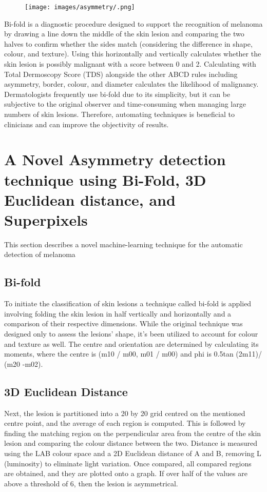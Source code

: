 \begin{figure}
    \centering
    \texttt{[image: images/asymmetry/.png]}
    \caption{} 
\end{figure}\label{asy-examples}



Bi-fold is a diagnostic procedure designed to support the recognition of melanoma by drawing a line down the middle of the skin lesion and comparing the two halves to confirm whether the sides match (considering the difference in shape, colour, and texture). Using this horizontally and vertically calculates whether the skin lesion is possibly malignant with a score between 0 and 2. Calculating with Total Dermoscopy Score (TDS) alongside the other ABCD rules including asymmetry, border, colour, and diameter calculates the likelihood of malignancy. Dermatologists frequently use bi-fold due to its simplicity, but it can be subjective to the original observer and time-consuming when managing large numbers of skin lesions. Therefore, automating techniques is beneficial to clinicians and can improve the objectivity of results.

\section{A Novel Asymmetry detection technique using Bi-Fold, 3D Euclidean distance, and Superpixels}
This section describes a novel machine-learning technique for the automatic detection of melanoma

\subsection{Bi-fold}
To initiate the classification of skin lesions a technique called bi-fold is applied involving folding the skin lesion in half vertically and horizontally and a comparison of their respective dimensions. While the original technique was designed only to assess the lesions' shape, it's been utilized to account for colour and texture as well. The centre and orientation are determined by calculating its moments, where the centre is (m10 / m00, m01 / m00) and phi is 0.5tan (2m11)/ (m20 -m02).


\subsection{3D Euclidean Distance}
Next, the lesion is partitioned into a 20 by 20 grid centred on the mentioned centre point, and the average of each region is computed. This is followed by finding the matching region on the perpendicular area from the centre of the skin lesion and comparing the colour distance between the two. Distance is measured using the LAB colour space and a 2D Euclidean distance of A and B, removing L (luminosity) to eliminate light variation. Once compared, all compared regions are obtained, and they are plotted onto a graph. If over half of the values are above a threshold of 6, then the lesion is asymmetrical.

